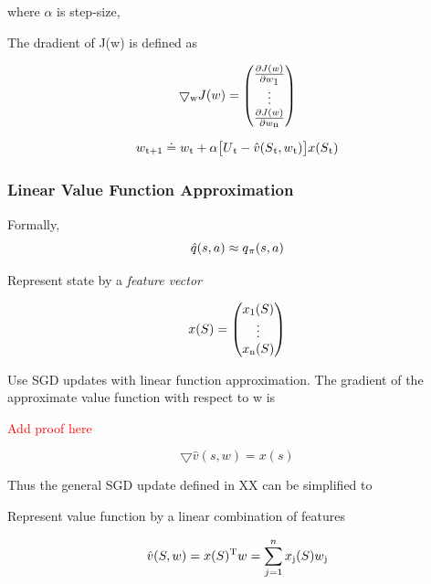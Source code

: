 \documentclass[12pt,twoside]{report}
\theoremstyle{plain}
\theoremstyle{definition}
\begin{document}
where $\alpha$ is step-size, 

The dradient of J(w) is defined as 

\begin{equation}
\bigtriangledown\textsubscript{w} J(w) =  \begin{pmatrix} \frac{\partial J(w)}{\partial w\textsubscript{1}}  \\ \vdots \\ \frac{\partial J(w)}{\partial w\textsubscript{n}}   \end{pmatrix}
\end{equation}


\begin{equation}
w\textsubscript{t+1} \doteq w\textsubscript{t} + \alpha \big[ U\textsubscript{t} - \hat{v}(S\textsubscript{t}, w\textsubscript{t})\big] x(S\textsubscript{t})
\end{equation}

\subsubsection{Linear Value Function Approximation}

Formally,
\begin{equation}
\hat{q}(s,a) \approx q\textsubscript{$\pi$} (s,a)
\end{equation}

Represent state by a \textit{feature vector}

\begin{equation}
x(S) = \begin{pmatrix} x\textsubscript{1}(S) \\ \vdots \\ x\textsubscript{n}(S)  \end{pmatrix}
\end{equation}

Use SGD updates with linear function approximation. The gradient of the approximate value function with respect to w is 

\textcolor{red}{Add proof here}

\begin{equation}
\bigtriangledown \hat{v}(s,w) = x(s)
\end{equation}

Thus the general SGD update defined in XX can be simplified to 

Represent value function by a linear combination of features

\begin{equation}
\hat{v}(S,w) = x(S)\textsuperscript{T}w = \sum_{j=1}^{n} x\textsubscript{j} (S) w\textsubscript{j}
\end{equation}
\end{document}
